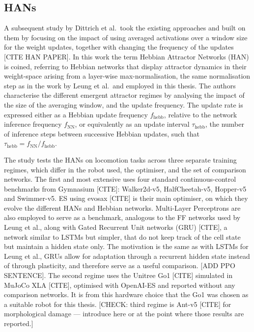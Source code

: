 \documentclass{article} %
\begin{document}
\subsection{HANs}
\label{subsec:HANs}

A subsequent study by Dittrich et al.\ took the existing approaches and built on them by focusing on the impact of using averaged activations over a window size for the weight updates, together with changing the frequency of the updates [CITE HAN PAPER]. In this work the term Hebbian Attractor Networks (HAN) is coined, referring to Hebbian networks that display attractor dynamics in their weight-space arising from a layer-wise max-normalisation, the same normalisation step as in the work by Leung et al.\ and employed in this thesis. The authors characterise the different emergent attractor regimes by analysing the impact of the size of the averaging window, and the update frequency. The update rate is expressed either as a Hebbian update frequency $f_{\mathrm{hebb}}$, relative to the network inference frequency $f_{\mathrm{NN}}$, or equivalently as an update interval $\tau_{\mathrm{hebb}}$, the number of inference steps between successive Hebbian updates, such that $\tau_{\mathrm{hebb}} = f_{\mathrm{NN}} / f_{\mathrm{hebb}}$.

The study tests the HANs on locomotion tasks across three separate training regimes, which differ in the robot used, the optimiser, and the set of comparison networks. The first and most extensive uses four standard continuous-control benchmarks from Gymnasium [CITE]: Walker2d-v5, HalfCheetah-v5, Hopper-v5 and Swimmer-v5. ES using evosax [CITE] is their main optimiser, on which they evolve the different HANs and Hebbian networks. Multi-Layer Perceptrons are also employed to serve as a benchmark, analogous to the FF networks used by Leung et al., along with Gated Recurrent Unit networks (GRU) [CITE], a network similar to LSTMs but simpler, that do not keep track of the cell state but maintain a hidden state only. The motivation is the same as with LSTMs for Leung et al., GRUs allow for adaptation through a recurrent hidden state instead of through plasticity, and therefore serve as a useful comparison. [ADD PPO SENTENCE]. The second regime uses the Unitree Go1 [CITE] simulated in MuJoCo XLA [CITE], optimised with OpenAI-ES and reported without any comparison networks. It is from this hardware choice that the Go1 was chosen as a suitable robot for this thesis. [CHECK: third regime is Ant-v5 [CITE] for morphological damage --- introduce here or at the point where those results are reported.]
\end{document}
